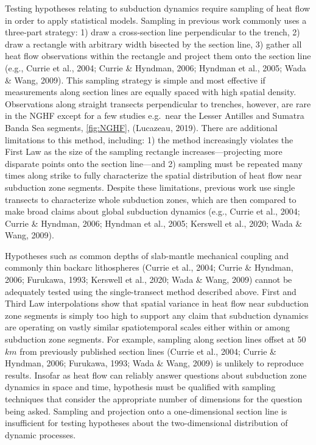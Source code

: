 \documentclass[draft,linenumbers]{agujournal2018}
\begin{document}
Testing hypotheses relating to subduction dynamics require sampling of
heat flow in order to apply statistical models. Sampling in previous
work commonly uses a three-part strategy: 1) draw a cross-section line
perpendicular to the trench, 2) draw a rectangle with arbitrary width
bisected by the section line, 3) gather all heat flow observations
within the rectangle and project them onto the section line (e.g.,
Currie et al., 2004; Currie \& Hyndman, 2006; Hyndman et al., 2005; Wada
\& Wang, 2009). This sampling strategy is simple and most effective if
measurements along section lines are equally spaced with high spatial
density. Observations along straight transects perpendicular to
trenches, however, are rare in the NGHF except for a few studies
e.g.~near the Lesser Antilles and Sumatra Banda Sea segments,
\ref{fig:NGHF}, (Lucazeau, 2019). There are additional limitations to
this method, including: 1) the method increasingly violates the First
Law as the size of the sampling rectangle increases---projecting more
disparate points onto the section line---and 2) sampling must be
repeated many times along strike to fully characterize the spatial
distribution of heat flow near subduction zone segments. Despite these
limitations, previous work use single transects to characterize whole
subduction zones, which are then compared to make broad claims about
global subduction dynamics (e.g., Currie et al., 2004; Currie \&
Hyndman, 2006; Hyndman et al., 2005; Kerswell et al., 2020; Wada \&
Wang, 2009).

Hypotheses such as common depths of slab-mantle mechanical coupling and
commonly thin backarc lithospheres (Currie et al., 2004; Currie \&
Hyndman, 2006; Furukawa, 1993; Kerswell et al., 2020; Wada \& Wang,
2009) cannot be adequately tested using the single-transect method
described above. First and Third Law interpolations show that spatial
variance in heat flow near subduction zone segments is simply too high
to support any claim that subduction dynamics are operating on vastly
similar spatiotemporal scales either within or among subduction zone
segments. For example, sampling along section lines offset at 50 \(km\)
from previously published section lines (Currie et al., 2004; Currie \&
Hyndman, 2006; Furukawa, 1993; Wada \& Wang, 2009) is unlikely to
reproduce results. Insofar as heat flow can reliably answer questions
about subduction zone dynamics in space and time, hypothesis must be
qualified with sampling techniques that consider the appropriate number
of dimensions for the question being asked. Sampling and projection onto
a one-dimensional section line is insufficient for testing hypotheses
about the two-dimensional distribution of dynamic processes.
\end{document}
